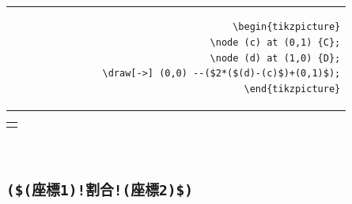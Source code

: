\documentclass[lualatex]{jlreq}
\begin{document}
\\[0.5em]
\begin{minipage}{0.58 \textwidth}
    \begin{flushright}
        \begin{tabular}{r}
            \begin{lstlisting}[language={[LaTeX] TeX},
            numbers=none,breaklines=true,gobble=12,frame=none]
            \begin{tikzpicture}
                \node (c) at (0,1) {C};
                \node (d) at (1,0) {D};
                \draw[->] (0,0) --($2*($(d)-(c)$)+(0,1)$);
            \end{tikzpicture}
            \end{lstlisting}
        \end{tabular}
    \end{flushright}
\end{minipage}
\hfill
\begin{minipage}{0.34 \textwidth}
    \begin{flushleft}
        \begin{tabular}{l}
            \begin{tikzpicture}
                \node (c) at (0,1) {C};
                \node (d) at (1,0) {D};
                \draw[->] (0,0) --($2*($(d)-(c)$)+(0,1)$);
            \end{tikzpicture}
        \end{tabular}
    \end{flushleft}
\end{minipage}
\\[1em]

\subsection{\texttt{(\$(座標1)!割合!(座標2)\$)}} %
\end{document}
